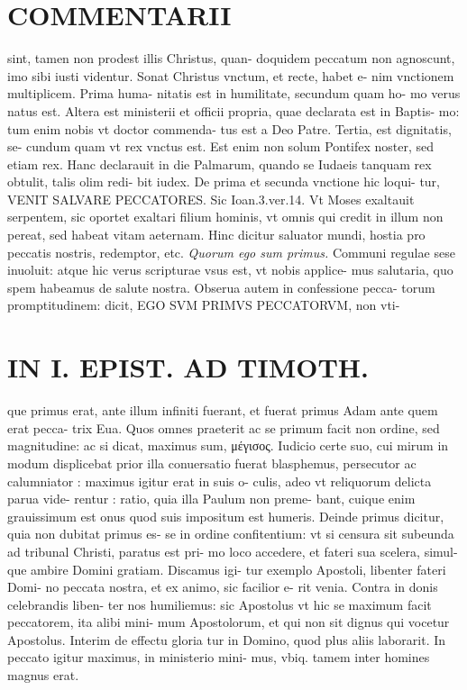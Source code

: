 \documentclass{article}
\begin{document}
\begin{pages}
\section*{COMMENTARII }
\marginpar{[ p.34 ]}\pstart sint, tamen non prodest illis Christus, quan- doquidem peccatum non agnoscunt, imo sibi iusti videntur.  \pend\pstart Sonat Christus vnctum, et recte, habet e- nim vnctionem multiplicem. Prima huma- nitatis est in humilitate, secundum quam ho- mo verus natus est. Altera est ministerii et officii propria, quae declarata est in Baptis- mo: tum enim nobis vt doctor commenda- tus est a Deo Patre. Tertia, est dignitatis, se- cundum quam vt rex vnctus est. Est enim non solum Pontifex noster, sed etiam rex. Hanc declarauit in die Palmarum, quando se Iudaeis tanquam rex obtulit, talis olim redi- bit iudex.  \pend\pstart De prima et secunda vnctione hic loqui- tur, VENIT SALVARE PECCATORES. Sic Ioan.3.ver.14. Vt Moses exaltauit serpentem, sic oportet exaltari filium hominis, vt omnis qui credit in illum non pereat, sed habeat vitam aeternam. Hinc dicitur saluator mundi, hostia pro peccatis nostris, redemptor, etc.  \pend
\textit{Quorum ego sum primus. }\pstart Communi regulae sese inuoluit: atque hic verus scripturae vsus est, vt nobis applice- mus salutaria, quo spem habeamus de salute nostra. Obserua autem in confessione pecca- torum promptitudinem: dicit, EGO SVM PRIMVS PECCATORVM, non vti-  \pend
\section*{IN I. EPIST. AD TIMOTH. }
\marginpar{[ p.35 ]}\pstart que primus erat, ante illum infiniti fuerant, et fuerat primus Adam ante quem erat pecca- trix Eua. Quos omnes praeterit ac se primum facit non ordine, sed magnitudine: ac si dicat, maximus sum, μέγισος. Iudicio certe suo, cui mirum in modum displicebat prior illa conuersatio fuerat blasphemus, persecutor ac calumniator : maximus igitur erat in suis o- culis, adeo vt reliquorum delicta parua vide- rentur : ratio, quia illa Paulum non preme- bant, cuique enim grauissimum est onus quod suis impositum est humeris. Deinde primus dicitur, quia non dubitat primus es- se in ordine confitentium: vt si censura sit subeunda ad tribunal Christi, paratus est pri- mo loco accedere, et fateri sua scelera, simul- que ambire Domini gratiam. Discamus igi- tur exemplo Apostoli, libenter fateri Domi- no peccata nostra, et ex animo, sic facilior e- rit venia. Contra in donis celebrandis liben- ter nos humiliemus: sic Apostolus vt hic se maximum facit peccatorem, ita alibi mini- mum Apostolorum, et qui non sit dignus qui vocetur Apostolus. Interim de effectu gloria tur in Domino, quod plus aliis laborarit. In peccato igitur maximus, in ministerio mini- mus, vbiq. tamem inter homines magnus erat.  \pend
\marginpar{[ p.36 ]}

\end{pages}
\end{document}
